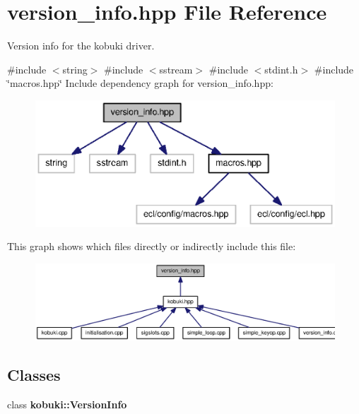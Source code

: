 \section{version\-\_\-info.\-hpp \-File \-Reference}
\label{version__info_8hpp}


\-Version info for the kobuki driver.  


{\ttfamily \#include $<$string$>$}\*
{\ttfamily \#include $<$sstream$>$}\*
{\ttfamily \#include $<$stdint.\-h$>$}\*
{\ttfamily \#include \char`\"{}macros.\-hpp\char`\"{}}\*
\-Include dependency graph for version\-\_\-info.\-hpp\-:
\nopagebreak
\begin{figure}[H]
\begin{center}
\leavevmode
\includegraphics[width=350pt]{version__info_8hpp__incl}
\end{center}
\end{figure}
\-This graph shows which files directly or indirectly include this file\-:
\nopagebreak
\begin{figure}[H]
\begin{center}
\leavevmode
\includegraphics[width=350pt]{version__info_8hpp__dep__incl}
\end{center}
\end{figure}
\subsection*{\-Classes}
\begin{DoxyCompactItemize}
\item 
class {\bf kobuki\-::\-Version\-Info}
\end{DoxyCompactItemize}
